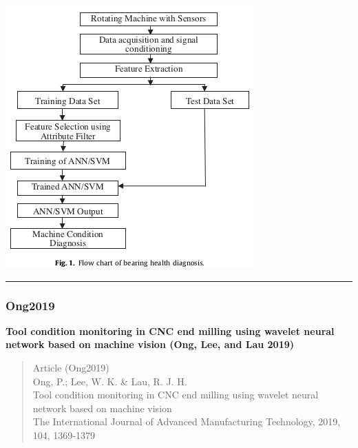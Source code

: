 \documentclass[
  letterpaper,
  DIV=11,
  numbers=noendperiod]{scrartcl}
\begin{document}
\includegraphics{img/2023-01-09-12-28-36.png}

\begin{center}\rule{0.5\linewidth}{0.5pt}\end{center}

\hypertarget{ong2019}{%
\subsubsection{Ong2019}\label{ong2019}}

\textbf{Tool condition monitoring in CNC end milling using wavelet
neural network based on machine vision (Ong, Lee, and Lau 2019)}

\begin{quote}
Article (Ong2019)\\
Ong, P.; Lee, W. K. \& Lau, R. J. H.\\
Tool condition monitoring in CNC end milling using wavelet neural
network based on machine vision\\
The International Journal of Advanced Manufacturing Technology, 2019,
104, 1369-1379
\end{quote}
\end{document}
